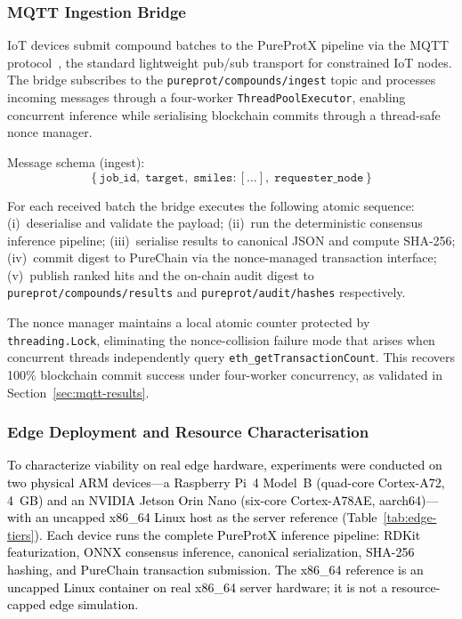 \documentclass[conference]{IEEEtran}
\newcommand{\rev}[2]{#2}
\begin{document}
\subsubsection{MQTT Ingestion Bridge}
\label{sec:mqtt}

IoT devices submit compound batches to the PureProtX pipeline
via the MQTT protocol~\cite{mqtt5}, the standard lightweight
pub/sub transport for constrained IoT nodes.
The bridge subscribes to the \texttt{pureprot/compounds/ingest}
topic and processes incoming messages through a four-worker
\texttt{ThreadPoolExecutor}, enabling concurrent inference while
serialising blockchain commits through a thread-safe nonce manager.

Message schema (ingest):
\begin{equation*}
\{\,\texttt{job\_id},\; \texttt{target},\;
   \texttt{smiles}: [\ldots],\;
   \texttt{requester\_node}\,\}
\end{equation*}

For each received batch the bridge executes the following
atomic sequence: (i)~deserialise and validate the payload;
(ii)~run the deterministic consensus inference pipeline;
(iii)~serialise results to canonical JSON and compute SHA-256;
(iv)~commit digest to PureChain via the nonce-managed
transaction interface; (v)~publish ranked hits and the
on-chain audit digest to \texttt{pureprot/compounds/results}
and \texttt{pureprot/audit/hashes} respectively.

The nonce manager maintains a local atomic counter protected
by \texttt{threading.Lock}, eliminating the nonce-collision
failure mode that arises when concurrent threads independently
query \texttt{eth\_getTransactionCount}.
This recovers 100\% blockchain commit success under
four-worker concurrency, as validated in
Section~\ref{sec:mqtt-results}.

\subsubsection{Edge Deployment and Resource Characterisation}
\label{sec:edge-deploy}

\textcolor{black}{To characterize viability on real edge hardware,
experiments were conducted on two physical ARM devices---a
Raspberry Pi~4 Model~B (quad-core Cortex-A72, 4~GB) and an
NVIDIA Jetson Orin Nano (six-core Cortex-A78AE, aarch64)---with
an uncapped x86\_64 Linux host as the server reference
(Table~\ref{tab:edge-tiers}). Each device runs the complete
PureProtX inference pipeline: RDKit featurization, \rev{R2.1}{ONNX consensus inference}, canonical serialization, SHA-256 hashing,
and PureChain transaction submission. The x86\_64 reference is
\rev{R1.1}{an uncapped Linux container on real x86\_64 server hardware; it is not a resource-capped edge simulation}.}
\end{document}
